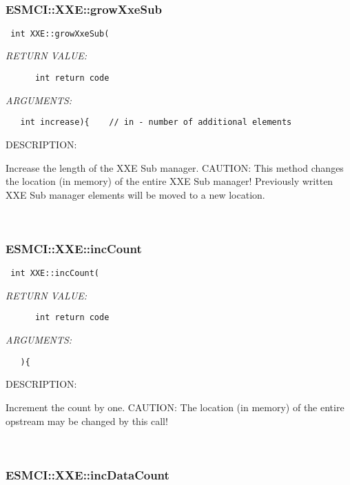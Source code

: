 \mbox{}\hrulefill\
 
\subsubsection [ESMCI::XXE::growXxeSub] {ESMCI::XXE::growXxeSub}


  
\begin{verbatim} int XXE::growXxeSub(\end{verbatim}{\em RETURN VALUE:}
\begin{verbatim}      int return code\end{verbatim}{\em ARGUMENTS:}
\begin{verbatim}   int increase){    // in - number of additional elements\end{verbatim}
{\sf DESCRIPTION:\\ }


    Increase the length of the XXE Sub manager.
    CAUTION: This method changes the location (in memory) of the entire
             XXE Sub manager!
      Previously written XXE Sub manager elements will be moved to a new
      location. 
 
\mbox{}\hrulefill\
 
\subsubsection [ESMCI::XXE::incCount] {ESMCI::XXE::incCount}


  
\begin{verbatim} int XXE::incCount(\end{verbatim}{\em RETURN VALUE:}
\begin{verbatim}      int return code\end{verbatim}{\em ARGUMENTS:}
\begin{verbatim}   ){\end{verbatim}
{\sf DESCRIPTION:\\ }


    Increment the count by one.
    CAUTION: The location (in memory) of the entire opstream may be changed by
             this call! 
 
\mbox{}\hrulefill\
 
\subsubsection [ESMCI::XXE::incDataCount] {ESMCI::XXE::incDataCount}


